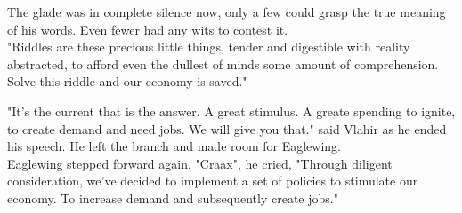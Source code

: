 The glade was in complete silence now, only a few could grasp the true meaning of his words. Even fewer had any wits to contest it. \\

"Riddles are these precious little things, tender and digestible with reality abstracted, to afford even the dullest of minds some amount of comprehension. Solve this riddle and our economy is saved."

"It's the current that is the answer. A great stimulus. A greate spending to ignite, to create demand and need jobs. We will give you that." said Vlahir as he ended his speech. He left the branch and made room for Eaglewing.\\

Eaglewing stepped forward again. "Craax", he cried, "Through diligent consideration, we've decided to implement a set of policies to stimulate our economy. To increase demand and subsequently create jobs."


